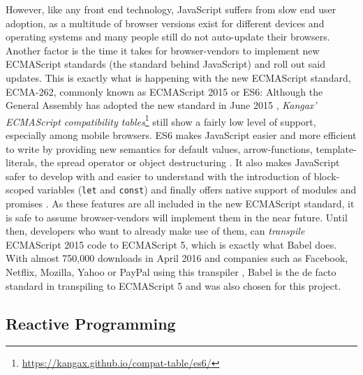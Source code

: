However, like any front end technology, JavaScript suffers from slow end user adoption, as a multitude of browser versions exist for different devices and operating systems and many people still do not auto-update their browsers. Another factor is the time it takes for browser-vendors to implement new ECMAScript standards (the standard behind JavaScript) and roll out said updates. This is exactly what is happening with the new ECMAScript standard, ECMA-262, commonly known as ECMAScript 2015 or ES6: Although the General Assembly has adopted the new standard in June 2015 \cite{ecma2015}, \emph{Kangax' ECMAScript compatibility tables}\footnote{\url{https://kangax.github.io/compat-table/es6/}} still show a fairly low level of support, especially among mobile browsers. ES6 makes JavaScript easier and more efficient to write by providing new semantics for default values, arrow-functions, template-literals, the spread operator or object destructuring \cite{es6}. It also makes JavaScript safer to develop with and easier to understand with the introduction of block-scoped variables (\texttt{let} and \texttt{const}) and finally offers native support of modules and promises \cite{es6}.
As these features are all included in the new ECMAScript standard, it is safe to assume browser-vendors will implement them in the near future. Until then, developers who want to already make use of them, can \emph{transpile} ECMAScript 2015 code to ECMAScript 5, which is exactly what Babel does. With almost 750,000 downloads in April 2016 \cite{npm-babel} and companies such as Facebook, Netflix, Mozilla, Yahoo or PayPal using this transpiler \cite{babel-users}, Babel is the de facto standard in transpiling to ECMAScript 5 and was also chosen for this project.

\subsection{Reactive Programming}
\label{sec:implementation-technologies-rxjs}

